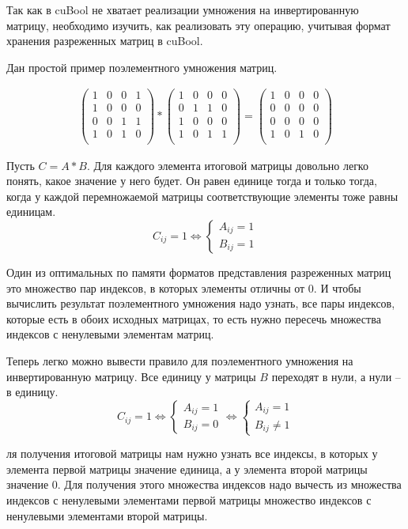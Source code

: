 Так как в cuBool не хватает реализации умножения на инвертированную матрицу, необходимо изучить, как реализовать эту операцию, учитывая формат хранения разреженных матриц в cuBool.

Дан простой пример поэлементного умножения матриц.

\begin{align*}
\begin{pmatrix}
  1 & 0 & 0 & 1  \\
  1 & 0 & 0 & 0  \\
  0 & 0 & 1 & 1  \\
  1 & 0 & 1 & 0  \\
\end{pmatrix}
* 
\begin{pmatrix}
  1 & 0 & 0 & 0  \\
  0 & 1 & 1 & 0  \\
  1 & 0 & 0 & 0  \\
  1 & 0 & 1 & 1  \\
\end{pmatrix}
=
\begin{pmatrix}
  1 & 0 & 0 & 0  \\
  0 & 0 & 0 & 0  \\
  0 & 0 & 0 & 0  \\
  1 & 0 & 1 & 0  \\
\end{pmatrix}
\end{align*}

Пусть $C = A * B$. Для каждого элемента итоговой матрицы довольно легко понять, какое значение у него будет. Он равен единице тогда и только тогда, когда у каждой перемножаемой матрицы соответствующие элементы тоже равны единицам.
$$
C_{ij} = 1
\Longleftrightarrow
\begin{cases}
    A_{ij} = 1 \\
    B_{ij} = 1
\end{cases}
$$

Один из оптимальных по памяти форматов представления разреженных матриц это множество пар индексов, в которых элементы отличны от 0. И чтобы вычислить результат поэлементного умножения надо узнать, все пары индексов, которые есть в обоих исходных матрицах, то есть нужно пересечь множества индексов с ненулевыми элементам матриц.

Теперь легко можно вывести правило для поэлементного умножения на инвертированную матрицу.
Все единицу у матрицы $B$ переходят в нули, а нули -- в единицу.
$$
C_{ij} = 1
\Longleftrightarrow
\begin{cases}
    A_{ij} = 1 \\
    B_{ij} = 0
\end{cases}
\Longleftrightarrow
\begin{cases}
    A_{ij} = 1 \\
    B_{ij} \ne 1
\end{cases}
$$

ля получения итоговой матрицы нам нужно узнать все индексы, в которых у элемента первой матрицы значение единица, а у элемента второй матрицы значение 0. Для получения этого множества индексов надо вычесть из множества индексов с ненулевыми элементами первой матрицы множество индексов с ненулевыми элементами второй матрицы.
